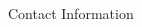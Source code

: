 \documentclass[final]{beamer}
\newlength{\onecolwid}
\begin{document}
\begin{frame}[t]
\begin{columns}[t]
\begin{column}{\onecolwid}
\begin{alertblock}{Contact Information}
\begin{columns}[onlytextwidth]
\begin{column}{0.17\textwidth}
\end{column}
\end{columns}

\end{alertblock}



\end{column} %

\end{columns} %

\end{frame} %
\end{document}
